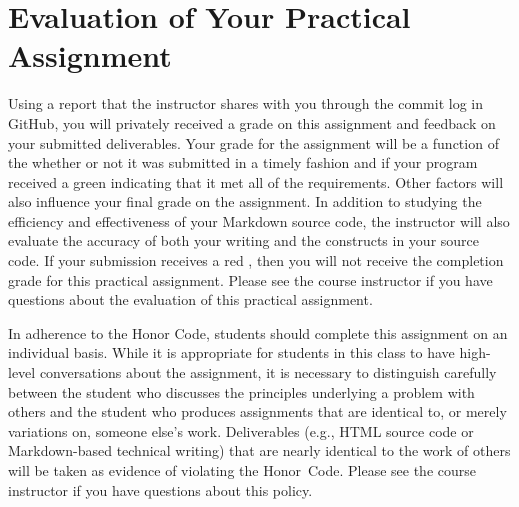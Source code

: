 \documentclass[11pt]{article}
\newcommand{\checkmark}{\ding{51}}
\newcommand{\naughtmark}{\ding{55}}
\begin{document}
\section*{Evaluation of Your Practical Assignment}

Using a report that the instructor shares with you through the commit log in
GitHub, you will privately received a grade on this assignment and feedback on
your submitted deliverables. Your grade for the assignment will be a function of
the whether or not it was submitted in a timely fashion and if your program
received a green \checkmark{} indicating that it met all of the requirements.
Other factors will also influence your final grade on the assignment. In
addition to studying the efficiency and effectiveness of your Markdown source
code, the instructor will also evaluate the accuracy of both your writing and
the constructs in your source code. If your submission receives a red
\naughtmark{}, then you will not receive the completion grade for this practical
assignment. Please see the course instructor if you have questions about the
evaluation of this practical assignment.

In adherence to the Honor Code, students should complete this assignment on an
individual basis. While it is appropriate for students in this class to have
high-level conversations about the assignment, it is necessary to distinguish
carefully between the student who discusses the principles underlying a
problem with others and the student who produces assignments that are
identical to, or merely variations on, someone else's work. Deliverables
(e.g., HTML source code or Markdown-based technical writing) that are nearly
identical to the work of others will be taken as evidence of violating the
\mbox{Honor Code}. Please see the course instructor if you have questions
about this policy.
\end{document}

